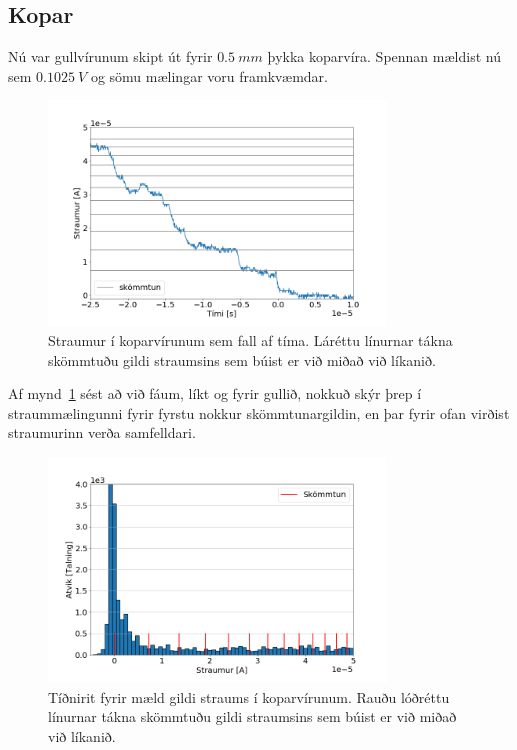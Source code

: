 \documentclass[11pt]{article}
\begin{document}
\subsection{Kopar}
Nú var gullvírunum skipt út fyrir $\SI{0.5}{mm}$ þykka koparvíra. Spennan mældist nú sem $\SI{0.1025}{V}$ og sömu mælingar voru framkvæmdar.

\begin{figure}[H]
    \centering
    \includegraphics[width=0.8\textwidth]{kopar-straumur.png}
    \caption{Straumur í koparvírunum sem fall af tíma. Láréttu línurnar tákna skömmtuðu gildi straumsins sem búist er við miðað við líkanið.}
    \label{fig:kopar_straumur}
\end{figure}

Af mynd~\ref{fig:kopar_straumur} sést að við fáum, líkt og fyrir gullið, nokkuð skýr þrep í straummælingunni fyrir fyrstu nokkur skömmtunargildin, en þar fyrir ofan virðist straumurinn verða samfelldari. 

\begin{figure}[H]
    \centering
    \includegraphics[width=0.8\textwidth]{kopar-hist-straumur.png}
    \caption{Tíðnirit fyrir mæld gildi straums í koparvírunum. Rauðu lóðréttu línurnar tákna skömmtuðu gildi straumsins sem búist er við miðað við líkanið.} 
    \label{fig:kopar_hist_straumur}
\end{figure}
\end{document}
